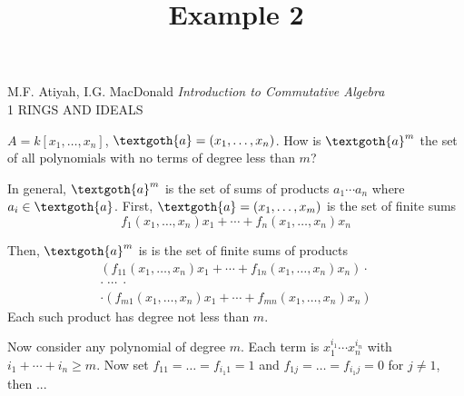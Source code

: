 \documentclass{article}
\title{Example 2}
\begin{document}
\maketitle

\begin{center}
M.F. Atiyah, I.G. MacDonald \emph{Introduction to Commutative Algebra} \\
1 RINGS AND IDEALS
\end{center}

\vspace*{10px} 

$ A = k[x_1, \dots, x_n]$, $\textgoth{a} = (x_1, \dots, x_n)$. How is $\textgoth{a}^m$ the set of all polynomials with no terms of degree less than $m$?

In general, $\textgoth{a}^m$ is the set of sums of products $a_1 \cdots a_n$ where $a_i \in \textgoth{a}$. First, $\textgoth{a} = (x_1, \dots, x_m)$ is the set of finite sums
\[
f_1(x_1, \dots, x_n)x_1 + \cdots + f_n(x_1, \dots, x_n)x_n
\]

Then, $\textgoth{a}^m$ is is the set of finite sums of products
\begin{gather*}
(f_{11}(x_1, \dots, x_n)x_1 + \cdots + f_{1n}(x_1, \dots, x_n)x_n) \cdot \\
\cdot \; \cdots \; \cdot \\
\cdot (f_{m1}(x_1, \dots, x_n)x_1 + \cdots + f_{mn}(x_1, \dots, x_n)x_n)
\end{gather*}
Each such product has degree not less than $m$.

Now consider any polynomial of degree $m$. Each term is $x_1^{i_1} \cdots x_n^{i_n}$ with $i_1 + \cdots + i_n \geq m$. Now set $f_{11} = \dots = f_{i_1 1} = 1$ and $f_{1j} = \dots = f_{i_1 j} = 0$ for $j \neq 1$, then ...
\end{document}
